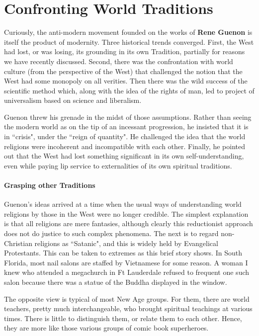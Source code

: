 \section{Confronting World Traditions}

Curiously, the anti-modern movement founded on the works of \textbf{Rene Guenon} is itself the product of modernity. Three historical trends converged. First, the West had lost, or was losing, its grounding in its own Tradition, partially for reasons we have recently discussed. Second, there was the confrontation with world culture (from the perspective of the West) that challenged the notion that the West had some monopoly on all verities. Then there was the wild success of the scientific method which, along with the idea of the rights of man, led to project of universalism based on science and liberalism.

Guenon threw his grenade in the midst of those assumptions. Rather than seeing the modern world as on the tip of an incessant progression, he insisted that it is in ``crisis", under the ``reign of quantity". He challenged the idea that the world religions were incoherent and incompatible with each other. Finally, he pointed out that the West had lost something significant in its own self-understanding, even while paying lip service to externalities of its own spiritual traditions.

\paragraph{Grasping other Traditions}
Guenon's ideas arrived at a time when the usual ways of understanding world religions by those in the West were no longer credible. The simplest explanation is that all religions are mere fantasies, although clearly this reductionist approach does not do justice to such complex phenomena. The next is to regard non-Christian religions as ``Satanic", and this is widely held by Evangelical Protestants. This can be taken to extremes as this brief story shows. In South Florida, most nail salons are staffed by Vietnamese for some reason. A woman I knew who attended a megachurch in Ft Lauderdale refused to frequent one such salon because there was a statue of the Buddha displayed in the window.

The opposite view is typical of most New Age groups. For them, there are world teachers, pretty much interchangeable, who brought spiritual teachings at various times. There is little to distinguish them, or relate them to each other. Hence, they are more like those various groups of comic book superheroes.

